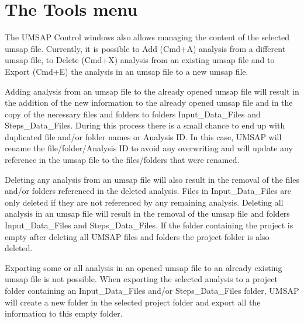 \section{The Tools menu}

The UMSAP Control windows also allows managing the content of the selected umsap
file. Currently, it is possible to Add (Cmd+A) analysis from a different umsap
file, to Delete (Cmd+X) analysis from an existing umsap file and to Export (Cmd+E)
the analysis in an umsap file to a new umsap file.

Adding analysis from an umsap file to the already opened umsap file will result
in the addition of the new information to the already opened umsap file and in the
copy of the necessary files and folders to folders Input{\_}Data{\_}Files and
Steps{\_}Data{\_}Files. During this process there is a small chance to end up with
duplicated file and/or folder names or Analysis ID. In this case, UMSAP will rename
the file/folder/Analysis ID to avoid any overwriting and will update any reference
in the umsap file to the files/folders that were renamed.

Deleting any analysis from an umsap file will also result in the removal of the
files and/or folders referenced in the deleted analysis. Files in Input{\_}Data{\_}Files
are only deleted if they are not referenced by any remaining analysis. Deleting
all analysis in an umsap file will result in the removal of the umsap file and folders
Input{\_}Data{\_}Files and Steps{\_}Data{\_}Files. If the folder containing the
project is empty after deleting all UMSAP files and folders the project folder is
also deleted.

Exporting some or all analysis in an opened umsap file to an already existing umsap
file is not possible. When exporting the selected analysis to a project folder containing
an Input{\_}Data{\_}Files and/or Steps{\_}Data{\_}Files folder, UMSAP will create a new
folder in the selected project folder and export all the information to this empty
folder.


